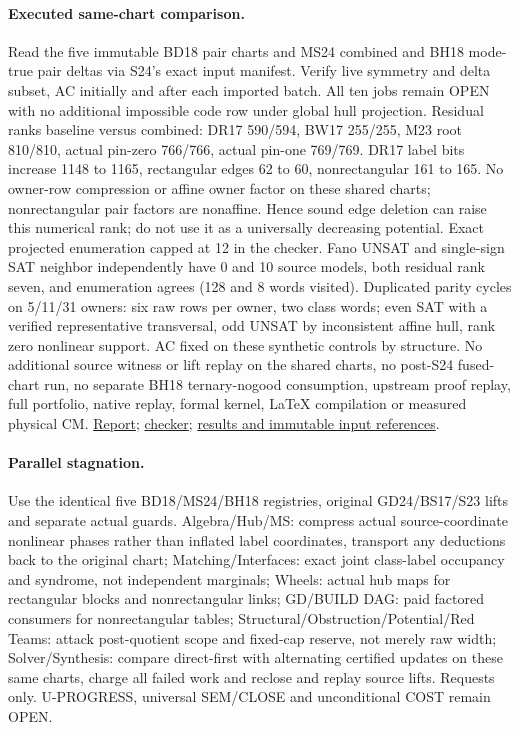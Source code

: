 \documentclass[11pt]{article}
\begin{document}
\paragraph{Executed same-chart comparison.}
Read the five immutable BD18 pair charts and MS24 combined and BH18 mode-true pair deltas via S24's exact input manifest. Verify live symmetry and delta subset, AC initially and after each imported batch. All ten jobs remain OPEN with no additional impossible code row under global hull projection. Residual ranks baseline versus combined: DR17 590/594, BW17 255/255, M23 root 810/810, actual pin-zero 766/766, actual pin-one 769/769. DR17 label bits increase 1148 to 1165, rectangular edges 62 to 60, nonrectangular 161 to 165. No owner-row compression or affine owner factor on these shared charts; nonrectangular pair factors are nonaffine. Hence sound edge deletion can raise this numerical rank; do not use it as a universally decreasing potential. Exact projected enumeration capped at 12 in the checker. Fano UNSAT and single-sign SAT neighbor independently have 0 and 10 source models, both residual rank seven, and enumeration agrees (128 and 8 words visited). Duplicated parity cycles on 5/11/31 owners: six raw rows per owner, two class words; even SAT with a verified representative transversal, odd UNSAT by inconsistent affine hull, rank zero nonlinear support. AC fixed on these synthetic controls by structure. No additional source witness or lift replay on the shared charts, no post-S24 fused-chart run, no separate BH18 ternary-nogood consumption, upstream proof replay, full portfolio, native replay, formal kernel, LaTeX compilation or measured physical CM. \href{https://github.com/j15marti/pnp/commit/deb30f2ef72da05a94c6ba0c6ec8fe6a5b70ed45}{Report}; \href{https://github.com/j15marti/pnp/commit/2a2e527859e273c8fe32b522ed40bd2fbc9afc57}{checker}; \href{https://github.com/j15marti/pnp/commit/fdced321f8d1f8c231f864a2feefe210a72d2b62}{results and immutable input references}.
\paragraph{Parallel stagnation.}
Use the identical five BD18/MS24/BH18 registries, original GD24/BS17/S23 lifts and separate actual guards. Algebra/Hub/MS: compress actual source-coordinate nonlinear phases rather than inflated label coordinates, transport any deductions back to the original chart; Matching/Interfaces: exact joint class-label occupancy and syndrome, not independent marginals; Wheels: actual hub maps for rectangular blocks and nonrectangular links; GD/BUILD DAG: paid factored consumers for nonrectangular tables; Structural/Obstruction/Potential/Red Teams: attack post-quotient scope and fixed-cap reserve, not merely raw width; Solver/Synthesis: compare direct-first with alternating certified updates on these same charts, charge all failed work and reclose and replay source lifts. Requests only. U-PROGRESS, universal SEM/CLOSE and unconditional COST remain OPEN.
\end{document}
